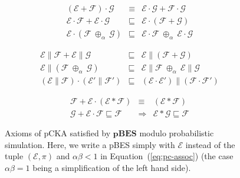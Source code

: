 \documentclass{llncs}
\newcommand{\pBES}{\mathbf{pBES}}
\newcommand{\EE}{\mathcal{E}}
\newcommand{\FF}{\mathcal{F}}
\newcommand{\G}{\mathcal{G}}
\newcommand{\refby}{\sqsubseteq}
\newcommand{\<}{\langle}
\renewcommand{\>}{\rangle}
\newcommand{\pc}[1]{{\ \oplus_{\!#1}\ }}
\begin{document}
\begin{figure}
\hspace{-1cm}\begin{minipage}{.5\linewidth}
\begin{eqnarray}
(\EE+\FF)\cdot \G & \equiv & \EE\cdot \G + \FF\cdot \G\label{eq:+-dist-seq} \\
\EE\cdot \FF+\EE\cdot \G & \refby & \EE \cdot (\FF+\G)\label{eq:+-subdist-seq}\\
\EE\cdot(\FF\pc{\alpha}\G)&\refby &\EE\cdot\FF\pc{\alpha}\EE\cdot\G\label{eq:pc-supdist-seq}
\end{eqnarray}
\end{minipage}
\begin{minipage}{.57\linewidth}
\begin{eqnarray}
\EE\| \FF+\EE\| \G & \refby & \EE \| (\FF+\G)\label{eq:+-subdist-par}\\
\EE\|(\FF\pc{\alpha}\G)& \refby&\EE\|\FF\pc{\alpha}\EE\|\G\label{eq:pc-supdist-par}\\
(\EE\|\FF)  \cdot (\EE'\| \FF') & \refby & (\EE\cdot \EE')\| (\FF\cdot \FF')\label{eq:interchange-law}
\end{eqnarray}
\end{minipage}

\begin{eqnarray}
\FF + \EE\cdot(\EE*\FF) & \equiv & (\EE*\FF) \label{eq:unfold}\\
\G + \EE\cdot\FF\refby\FF&\Rightarrow&\EE*\G\refby\FF\label{eq:induction}
\end{eqnarray}

\caption{Axioms of pCKA satisfied by $\pBES$ modulo probabilistic simulation. Here, we write a pBES simply with $\EE$ instead of the tuple $(\EE,\pi)$ and $\alpha\beta<1$ in Equation~(\ref{eq:pc-assoc}) (the case $\alpha\beta=1$ being a simplification of the left hand side).}\label{fig:axioms}
\end{figure}
\end{document}
